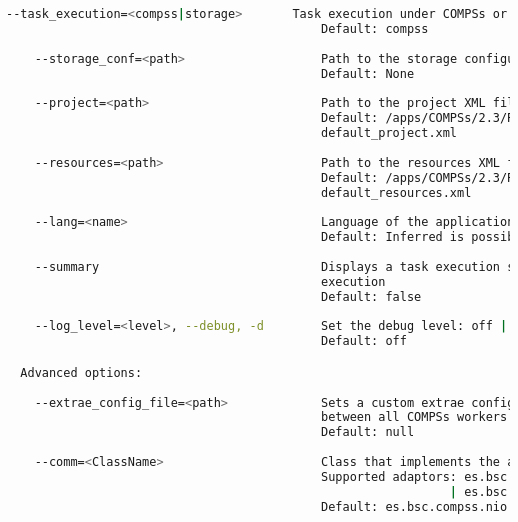 \begin{lstlisting}[language=bash]
    --task_execution=<compss|storage>       Task execution under COMPSs or Storage.
                                            Default: compss
                                            
    --storage_conf=<path>                   Path to the storage configuration file
                                            Default: None
                                            
    --project=<path>                        Path to the project XML file
                                            Default: /apps/COMPSs/2.3/Runtime/configuration/xml/projects/
                                            default_project.xml
                                            
    --resources=<path>                      Path to the resources XML file
                                            Default: /apps/COMPSs/2.3/Runtime/configuration/xml/resources/
                                            default_resources.xml
                                            
    --lang=<name>                           Language of the application (java/c/python)
                                            Default: Inferred is possible. Otherwise: java
                                            
    --summary                               Displays a task execution summary at the end of the application
                                            execution
                                            Default: false
                                            
    --log_level=<level>, --debug, -d        Set the debug level: off | info | debug
                                            Default: off

  Advanced options:
  
    --extrae_config_file=<path>             Sets a custom extrae config file. Must be in a shared disk
                                            between all COMPSs workers.
                                            Default: null
                                            
    --comm=<ClassName>                      Class that implements the adaptor for communications
                                            Supported adaptors: es.bsc.compss.nio.master.NIOAdaptor
                                                              | es.bsc.compss.gat.master.GATAdaptor
                                            Default: es.bsc.compss.nio.master.NIOAdaptor
                                            

\end{lstlisting}
